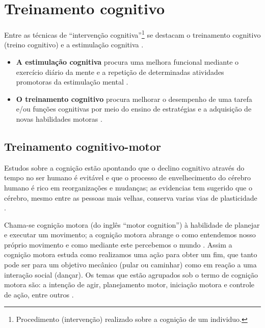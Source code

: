 
\section{Treinamento cognitivo}
\label{sec:sec-cognitive-trainning}

Entre as técnicas de ``intervenção cognitiva''\footnote{Procedimento (intervenção) 
realizado sobre a cognição de um individuo.} se 
destacam o treinamento cognitivo (treino cognitivo) e a estimulação cognitiva
\cite[pp. 10]{mastersthesisLima2017}.
\begin{itemize}
\item \textbf{A estimulação cognitiva} procura uma melhora funcional mediante o exercício diário da mente e 
a repetição de determinadas atividades promotoras da estimulação mental
\cite[pp. 14]{chariglione2013contribuiccoes} \cite[pp. 10]{mastersthesisLima2017}.
\item \textbf{O treinamento cognitivo} procura melhorar o desempenho de uma tarefa 
e/ou funções cognitivas por meio do ensino de estratégias e a adquisição de novas habilidades motoras
\cite[pp. 14]{chariglione2013contribuiccoes} \cite[pp. 10]{mastersthesisLima2017}.
\end{itemize}


\subsection{Treinamento cognitivo-motor}
\label{subsec:sec-motor-cognitive}


Estudos sobre a cognição estão apontando que o declino cognitivo através do tempo no ser humano 
é evitável e que o processo de envelhecimento do cérebro humano é rico em reorganizações e mudanças;
as evidencias tem sugerido que o cérebro, mesmo entre as pessoas mais velhas, conserva varias vias de plasticidade
\cite{Gutchess579} \cite{wollesen2020effects} \cite[pp. 22]{variseefeitos}.

\begin{definition}
\label{def:cognitivo-motor}
Chama-se cognição motora (do inglês ``motor cognition'') à habilidade de planejar e executar um movimento;
a cognição motora abrange o como entendemos nosso próprio movimento e como mediante este percebemos o mundo \cite{fuentes2007motor}  \cite[pp. 6]{mastersthesisLima2017}.
Assim a cognição motora estuda como realizamos uma ação para obter um fim, 
que tanto pode ser para um objetivo mecânico (pular ou caminhar) como em reação a uma interação social (dançar).
Os temas que estão agrupados sob o termo de cognição motora são: 
a intenção de agir, planejamento motor, iniciação motora e controle de ação, entre outros \cite{herbet2019awake}.
\begin{comment}
``A chave para a compreensão da natureza da cognição motora é o ciclo percepção-ação, 
ou seja, a transformação da percepção de um padrão perceptivo em padrões de 
movimentos coordenados'' \cite[pp. 6]{mastersthesisLima2017}.
\end{comment}
\end{definition}


